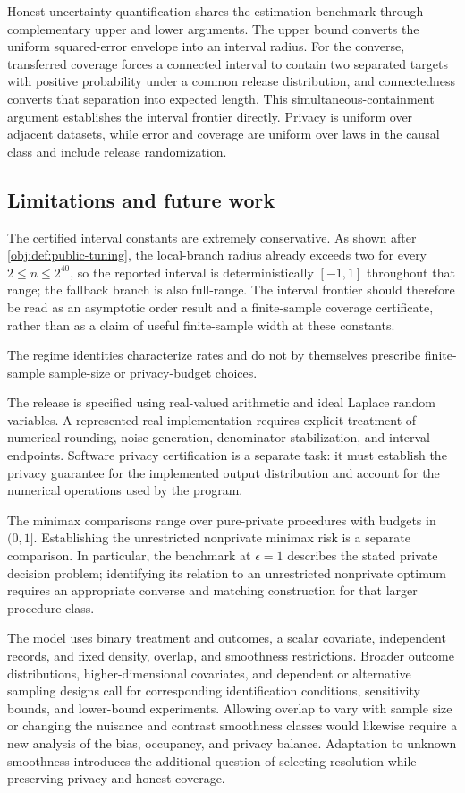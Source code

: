\documentclass[11pt]{article}
\begin{document}
Honest uncertainty quantification shares the estimation benchmark through complementary upper and lower arguments. The upper bound converts the uniform squared-error envelope into an interval radius. For the converse, transferred coverage forces a connected interval to contain two separated targets with positive probability under a common release distribution, and connectedness converts that separation into expected length. This simultaneous-containment argument establishes the interval frontier directly. Privacy is uniform over adjacent datasets, while error and coverage are uniform over laws in the causal class and include release randomization.

\subsection{Limitations and future work}

The certified interval constants are extremely conservative. As shown after \cref{obj:def:public-tuning}, the local-branch radius already exceeds two for every \(2\le n\le2^{40}\), so the reported interval is deterministically \([-1,1]\) throughout that range; the fallback branch is also full-range. The interval frontier should therefore be read as an asymptotic order result and a finite-sample coverage certificate, rather than as a claim of useful finite-sample width at these constants.

The regime identities characterize rates and do not by themselves prescribe finite-sample sample-size or privacy-budget choices.

The release is specified using real-valued arithmetic and ideal Laplace random variables. A represented-real implementation requires explicit treatment of numerical rounding, noise generation, denominator stabilization, and interval endpoints. Software privacy certification is a separate task: it must establish the privacy guarantee for the implemented output distribution and account for the numerical operations used by the program.

The minimax comparisons range over pure-private procedures with budgets in \((0,1]\). Establishing the unrestricted nonprivate minimax risk is a separate comparison. In particular, the benchmark at \(\epsilon=1\) describes the stated private decision problem; identifying its relation to an unrestricted nonprivate optimum requires an appropriate converse and matching construction for that larger procedure class.

The model uses binary treatment and outcomes, a scalar covariate, independent records, and fixed density, overlap, and smoothness restrictions. Broader outcome distributions, higher-dimensional covariates, and dependent or alternative sampling designs call for corresponding identification conditions, sensitivity bounds, and lower-bound experiments. Allowing overlap to vary with sample size or changing the nuisance and contrast smoothness classes would likewise require a new analysis of the bias, occupancy, and privacy balance. Adaptation to unknown smoothness introduces the additional question of selecting resolution while preserving privacy and honest coverage.
\end{document}
